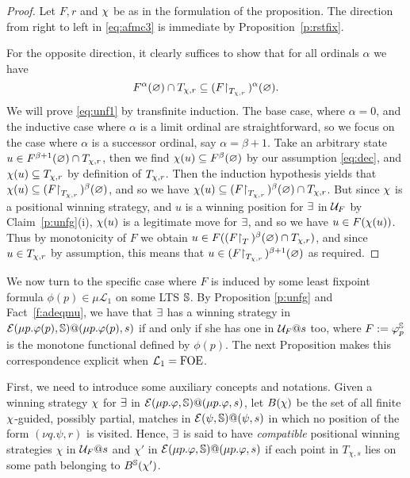 \begin{proof}
Let $F,r$ and $\chi$ be as in the formulation of the proposition.
The direction from right to left in \eqref{eq:afmc3} is immediate by
Proposition~\ref{p:rstfix}.

For the opposite direction, it clearly suffices to show that for all ordinals 
$\alpha$ we have
\begin{equation}
\label{eq:unf1}
F^{\al}(\nada) \cap T_{\ystrat,r} \sse (F\rst{T_{\ystrat,r}})^{\alpha}(\nada).
\end{equation}
We will prove \eqref{eq:unf1} by transfinite induction.
The base case, where $\alpha = 0$, and the inductive case where $\alpha$ is a 
limit ordinal are straightforward, so we focus on the case where $\alpha$ is a 
successor ordinal, say $\alpha = \beta +1$.
Take an arbitrary state $u \in F^{\beta+1}(\varnothing) \cap T_{\chi,r}$, then we 
find $\chi(u) \subseteq F^{\beta}(\varnothing)$ by our assumption \eqref{eq:dec}, and 
$\chi(u) \subseteq T_{\chi,r}$ by definition of $T_{\chi,r}$.
Then the induction hypothesis yields that 
$\chi(u) \subseteq (F{\upharpoonright}_{T_{\chi,r}}\,)^{\beta}(\varnothing)$, and so we have 
$\chi(u) \subseteq (F{\upharpoonright}_{T_{\chi,r}}\,)^{\beta}(\varnothing) \cap T_{\chi,r}$.
But since $\chi$ is a positional winning strategy, and $u$ is a winning 
position for $\exists$ in $\mathcal{U}_{F}$ by Claim~\ref{p:unfg}(i), $\chi(u)$ is a
legitimate move for $\exists$, and so we have $u \in F(\chi(u))$.
Thus by monotonicity of $F$ we obtain $u \in 
F((F{\upharpoonright}_{T}\,)^{\beta}(\varnothing) \cap T_{\chi,r})$, and since $u \in T_{\chi,r}$ 
by assumption, this means that $u \in (F{\upharpoonright}_{T_{\chi,r}}\,)^{\beta+1}(\varnothing)$ as 
required.
\end{proof}

We now turn to the specific case where $F$ is induced by some least fixpoint 
formula $\phi(p) \in \mu\mathcal{L}_1$ on some LTS $\mathbb{S}$.   
By Proposition \ref{p:unfg} and Fact~\ref{f:adeqmu}, we have that $\exists$ has
a winning strategy in  $\mathcal{E}(\mu p.\varphi(p),\mathbb{S})@(\mu p.\varphi(p),s)$ if and only if she has one in $\mathcal{U}_{F}@s$ too, where $F := \varphi_{p}^{\mathbb{S}}$ is the monotone functional defined by $\phi(p)$. The next Proposition  makes this correspondence explicit when $\mathcal{L}_1=\mathrm{FOE}$. 

First, we need to introduce some auxiliary concepts and notations.
Given  a winning strategy   $\chi$ for $\exists$ in $\mathcal{E}(\mu p. \varphi,\mathbb{S})@(\mu p. \varphi,s)$, 
let $B(\chi)$ be the set of all finite $\chi$-guided, possibly partial, 
matches in  $\mathcal{E}(\psi,\mathbb{S})@(\psi,s)$ in which no position of the form 
$(\nu q. \psi, r)$ is visited. 
Hence, $\exists$ is said to have \emph{compatible} positional winning strategies
$\chi$ in $\mathcal{U}_F@s$ and  $\chi'$  in $\mathcal{E}(\mu p.\varphi,\mathbb{S})@(\mu p.\varphi,s)$ if
each point in $T_{\chi,s}$ lies on some path belonging to $B^{\mathbb{S}}(\chi')$. 

